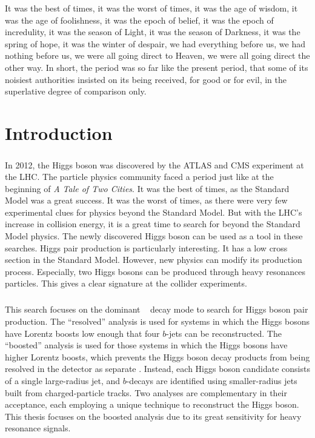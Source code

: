 \begin{savequote}[75mm]
It was the best of times, it was the worst of times, it was the age of wisdom, it was the age of foolishness, it was the epoch of belief, it was the epoch of incredulity, it was the season of Light, it was the season of Darkness, it was the spring of hope, it was the winter of despair, we had everything before us, we had nothing before us, we were all going direct to Heaven, we were all going direct the other way. In short, the period was so far like the present period, that some of its noisiest authorities insisted on its being received, for good or for evil, in the superlative degree of comparison only.
\end{savequote}

\chapter{Introduction}
\label{introduction}

\paragraph{}
In 2012, the Higgs boson was discovered by the ATLAS and CMS experiment at the LHC. 
The particle physics community faced a period just like at the beginning of \textit{A Tale of Two Cities}. 
It was the best of times, as the Standard Model was a great success.
It was the worst of times, as there were very few experimental clues for physics beyond the Standard Model.
But with the LHC's increase in collision energy, it is a great time to search for beyond the Standard Model physics.
The newly discovered Higgs boson can be used as a tool in these searches.
Higgs pair production is particularly interesting.
It has a low cross section in the Standard Model.
However, new physics can modify its production process. 
Especially, two Higgs bosons can be produced through heavy resonances particles.
This gives a clear signature at the collider experiments.

\paragraph{}
This search focuses on the dominant \hbb~ decay mode to search for Higgs boson pair production. 
The ``resolved'' analysis is used for \hh systems in which the Higgs bosons have Lorentz boosts low enough that four $b$-jets can be reconstructed. 
The ``boosted'' analysis is used for those \hh systems in which the Higgs bosons have higher Lorentz boosts, which prevents the Higgs boson decay products from being resolved in the detector as separate \bjets. 
Instead, each Higgs boson candidate consists of a single large-radius jet, and $b$-decays are identified using smaller-radius jets built from charged-particle tracks.
Two analyses are complementary in their acceptance, each employing a unique technique to reconstruct the Higgs boson.
This thesis focuses on the boosted analysis due to its great sensitivity for heavy resonance signals.

